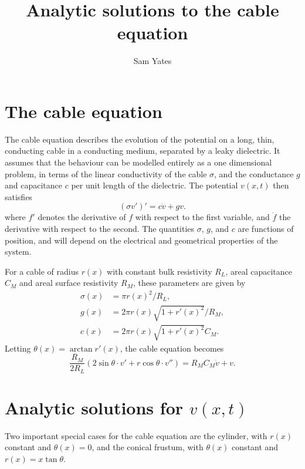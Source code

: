 \documentclass[parskip=half]{scrartcl}
\title{Analytic solutions to the cable equation}
\author{Sam Yates}
\theoremstyle{nonumberplain}
\begin{document}
\maketitle

\section{The cable equation}

The cable equation describes the evolution of the potential
on a long, thin, conducting cable in a conducting medium, separated
by a leaky dielectric. It assumes that the behaviour
can be modelled entirely as a one dimensional problem,
in terms of the linear conductivity of the cable $\sigma$,
and the conductance $g$ and capacitance $c$ per unit length of the
dielectric. The potential $v(x, t)$ then satisfies
\begin{equation}
    (\sigma v')' = c \dot v + g v.
\end{equation}
where $f'$ denotes the derivative of $f$ with respect to the first
variable, and $\dot{f}$ the derivative with respect to the second.
The quantities $\sigma$, $g$, and $c$ are functions of position,
and will depend on the electrical and geometrical properties of
the system.

For a cable of radius $r(x)$ with constant bulk resistivity
$R_L$, areal capacitance $C_M$ and areal surface resistivity
$R_M$, these parameters are given by
\begin{align}
    \sigma(x) &= \pi r(x)^2 / R_L, \\
    g(x) &= 2 \pi r(x) \sqrt{1 + r'(x)^2} / R_M, \\
    c(x) &= 2 \pi r(x) \sqrt{1 + r'(x)^2} C_M.
\end{align}
Letting $\theta(x) = \arctan r'(x)$, the cable equation becomes
\begin{equation}
    \label{eq:constelec}
    \frac{R_M}{2 R_L}\left(
        2\sin\theta\cdot v' + r \cos\theta\cdot v''
    \right) =
    R_M C_M \dot v + v.
\end{equation}

\section{Analytic solutions for $v(x, t)$}

Two important special cases for the cable equation are the cylinder,
with $r(x)$ constant and $\theta(x)=0$, and the conical frustum,
with $\theta(x)$ constant and $r(x)=x\tan\theta$.
\end{document}
